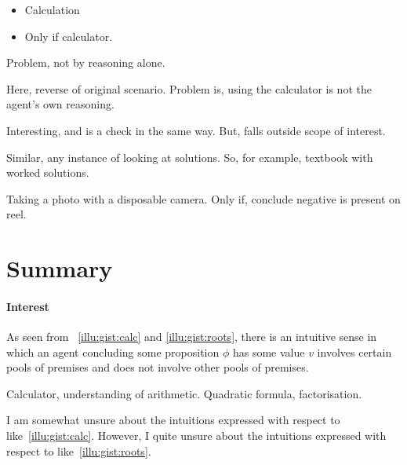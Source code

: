 \begin{note}[Calculation II]
  \begin{scenario}[Calculation II]
    \mbox{}
    \vspace{-\baselineskip}
    \begin{itemize}
    \item
      Calculation
    \item
      Only if calculator.
    \end{itemize}
  \end{scenario}

  Problem, not by reasoning alone.

  Here, reverse of original scenario.
  Problem is, using the calculator is not the agent's own reasoning.

  Interesting, and is a check in the same way.
  But, falls outside scope of interest.

  Similar, any instance of looking at solutions.
  So, for example, textbook with worked solutions.

  Taking a photo with a disposable camera.
  Only if, conclude negative is present on reel.
\end{note}

\section{Summary}

\paragraph*{Interest}

\begin{note}
  As seen from ~\ref{illu:gist:calc} and \ref{illu:gist:roots}, there is an intuitive sense in which an agent concluding some proposition \(\phi\) has some value \(v\) involves certain pools of premises and does not involve other pools of premises.

  Calculator, understanding of arithmetic.
  Quadratic formula, factorisation.

  I am somewhat unsure about the intuitions expressed with respect to  like~\autoref{illu:gist:calc}.
  However, I quite unsure about the intuitions expressed with respect to  like~\autoref{illu:gist:roots}.
\end{note}


